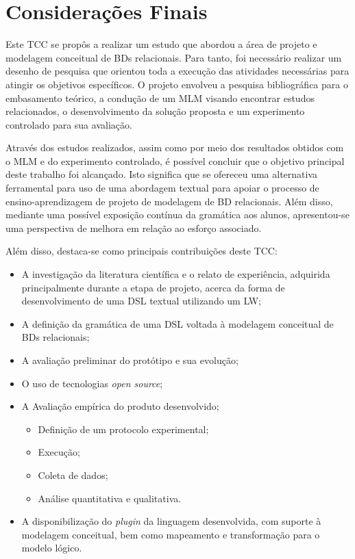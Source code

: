\chapter{Considerações Finais}\label{consideracoesFinais}

Este \ac{TCC} se propôs a realizar um estudo que abordou a área de projeto e modelagem conceitual de \acp{BD} relacionais.
Para tanto, foi necessário realizar um desenho de pesquisa que orientou toda a execução das atividades necessárias para atingir os objetivos específicos.
O projeto envolveu a pesquisa bibliográfica para o embasamento teórico, a condução de um \ac{MLM} visando encontrar estudos relacionados, o desenvolvimento da solução proposta e um experimento controlado para sua avaliação.

Através dos estudos realizados, assim como por meio dos resultados obtidos com o \ac{MLM} e do experimento controlado, é possível concluir que o objetivo principal deste trabalho foi alcançado.
Isto significa que se ofereceu uma alternativa ferramental para uso de uma abordagem textual para apoiar o processo de ensino-aprendizagem de projeto de modelagem de \ac{BD} relacionais. Além disso, mediante uma possível exposição contínua da gramática aos alunos, apresentou-se uma perspectiva de melhora em relação ao esforço associado. 

Além disso, destaca-se como principais contribuições deste \ac{TCC}:

\begin{itemize}
    \item A investigação da literatura científica e o relato de experiência, adquirida principalmente durante a etapa de projeto, acerca da forma de desenvolvimento de uma \ac{DSL} textual utilizando um \ac{LW};
    \item A definição da gramática de uma \ac{DSL} voltada à modelagem conceitual de \acp{BD} relacionais;
    \item A avaliação preliminar do protótipo e sua evolução;
    \item O uso de tecnologias \textit{open source};
    \item A Avaliação empírica do produto desenvolvido;
        \begin{itemize}
            \item Definição de um protocolo experimental;
            \item Execução;
            \item Coleta de dados;
            \item Análise quantitativa e qualitativa.
        \end{itemize}
    \item A disponibilização do \textit{plugin} da linguagem desenvolvida, com suporte à modelagem conceitual, bem como mapeamento e transformação para o modelo lógico.
\end{itemize}

